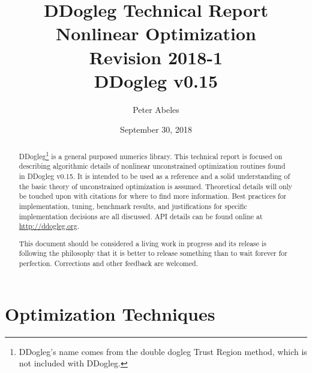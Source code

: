 \documentclass[peerreview,compsoc,onecolumn]{IEEEtran}
\begin{document}
\title{DDogleg Technical Report\\ Nonlinear Optimization\\{\Large Revision 2018-1}\\{\footnotesize DDogleg v0.15}}


\author{Peter Abeles}
\date{September 30, 2018}

\maketitle
\tableofcontents
\listoffigures
\listoftables

\IEEEpeerreviewmaketitle
\begin{abstract}
DDogleg\footnote{DDogleg's name comes from the double dogleg Trust Region method, which is not included with DDogleg.} is a general purposed numerics library. This technical report is focused on describing algorithmic details of nonlinear unconstrained optimization routines found in DDogleg v0.15. It is intended to be used as a reference and a solid understanding of the basic theory of unconstrained optimization is assumed. Theoretical details will only be touched upon with citations for where to find more information. Best practices for implementation, tuning, benchmark results, and justifications for specific implementation decisions are all discussed. API details can be found online at \url{http://ddogleg.org}.

This document should be considered a living work in progress and its release is following the philosophy that it is better to release something than to wait forever for perfection. Corrections and other feedback are welcomed.
\end{abstract}


\section{Optimization Techniques}
\end{document}
